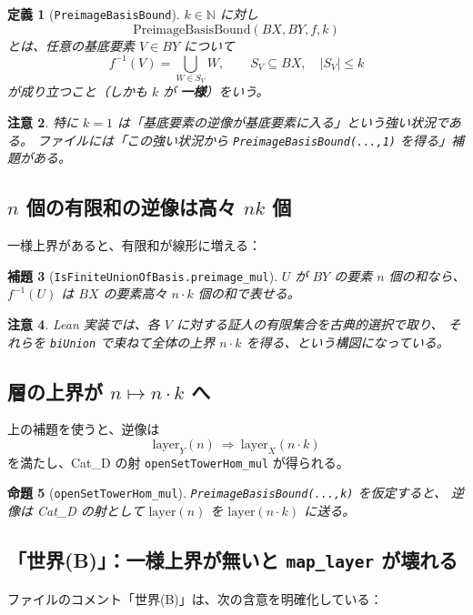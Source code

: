 \documentclass[a4paper,11pt]{article}
\newtheorem{definition}{定義}[section]
\newtheorem{lemma}[definition]{補題}
\newtheorem{proposition}[definition]{命題}
\newtheorem{remark}[definition]{注意}
\begin{document}
\begin{definition}[\texttt{PreimageBasisBound}]
$k\in\mathbb{N}$ に対し
\[
\mathrm{PreimageBasisBound}(BX,BY,f,k)
\]
とは、任意の基底要素 $V\in BY$ について
\[
f^{-1}(V)=\bigcup_{W\in S_V} W,\qquad S_V\subseteq BX,\quad |S_V|\le k
\]
が成り立つこと（しかも $k$ が \textbf{一様}）をいう。
\end{definition}

\begin{remark}
特に $k=1$ は「基底要素の逆像が基底要素に入る」という強い状況である。
ファイルには「この強い状況から \texttt{PreimageBasisBound(...,1)} を得る」補題がある。
\end{remark}

\subsection{$n$ 個の有限和の逆像は高々 $nk$ 個}
一様上界があると、有限和が線形に増える：

\begin{lemma}[\texttt{IsFiniteUnionOfBasis.preimage\_mul}]
$U$ が $BY$ の要素 $n$ 個の和なら、$f^{-1}(U)$ は $BX$ の要素高々 $n\cdot k$ 個の和で表せる。
\end{lemma}

\begin{remark}
Lean 実装では、各 $V$ に対する証人の有限集合を古典的選択で取り、
それらを \texttt{biUnion} で束ねて全体の上界 $n\cdot k$ を得る、という構図になっている。
\end{remark}

\subsection{層の上界が $n\mapsto n\cdot k$ へ}
上の補題を使うと、逆像は
\[
\mathrm{layer}_Y(n)\ \Rightarrow\ \mathrm{layer}_X(n\cdot k)
\]
を満たし、Cat\_D の射 \texttt{openSetTowerHom\_mul} が得られる。

\begin{proposition}[\texttt{openSetTowerHom\_mul}]
\texttt{PreimageBasisBound(...,k)} を仮定すると、
逆像は Cat\_D の射として
$\mathrm{layer}(n)$ を $\mathrm{layer}(n\cdot k)$ に送る。
\end{proposition}

\subsection{「世界(B)」：一様上界が無いと \texttt{map\_layer} が壊れる}
ファイルのコメント「世界(B)」は、次の含意を明確化している：
\end{document}
